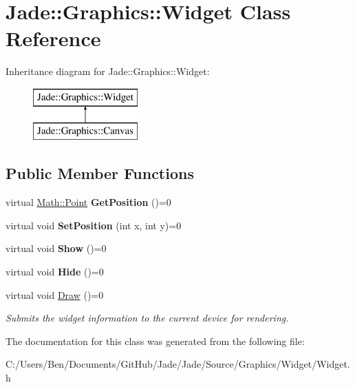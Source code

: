\hypertarget{class_jade_1_1_graphics_1_1_widget}{}\section{Jade\+:\+:Graphics\+:\+:Widget Class Reference}
\label{class_jade_1_1_graphics_1_1_widget}
Inheritance diagram for Jade\+:\+:Graphics\+:\+:Widget\+:\begin{figure}[H]
\begin{center}
\leavevmode
\includegraphics[height=2.000000cm]{class_jade_1_1_graphics_1_1_widget}
\end{center}
\end{figure}
\subsection*{Public Member Functions}
\begin{DoxyCompactItemize}
\item 
\hypertarget{class_jade_1_1_graphics_1_1_widget_a6b4cf0eb5064c61cf56ebb44681a2c60}{}virtual \hyperlink{class_jade_1_1_math_1_1_point}{Math\+::\+Point} {\bfseries Get\+Position} ()=0\label{class_jade_1_1_graphics_1_1_widget_a6b4cf0eb5064c61cf56ebb44681a2c60}

\item 
\hypertarget{class_jade_1_1_graphics_1_1_widget_ab89794b5d4ee480828ea6de52c9b1048}{}virtual void {\bfseries Set\+Position} (int x, int y)=0\label{class_jade_1_1_graphics_1_1_widget_ab89794b5d4ee480828ea6de52c9b1048}

\item 
\hypertarget{class_jade_1_1_graphics_1_1_widget_a16d7008052de562ea8d52b3c97c801c3}{}virtual void {\bfseries Show} ()=0\label{class_jade_1_1_graphics_1_1_widget_a16d7008052de562ea8d52b3c97c801c3}

\item 
\hypertarget{class_jade_1_1_graphics_1_1_widget_a0ad3acf723f554f315da105d9b36e921}{}virtual void {\bfseries Hide} ()=0\label{class_jade_1_1_graphics_1_1_widget_a0ad3acf723f554f315da105d9b36e921}

\item 
\hypertarget{class_jade_1_1_graphics_1_1_widget_adb8d9882202a73428260cbd3d8b15f9a}{}virtual void \hyperlink{class_jade_1_1_graphics_1_1_widget_adb8d9882202a73428260cbd3d8b15f9a}{Draw} ()=0\label{class_jade_1_1_graphics_1_1_widget_adb8d9882202a73428260cbd3d8b15f9a}

\begin{DoxyCompactList}\small\item\em Submits the widget information to the current device for rendering. \end{DoxyCompactList}\end{DoxyCompactItemize}


The documentation for this class was generated from the following file\+:\begin{DoxyCompactItemize}
\item 
C\+:/\+Users/\+Ben/\+Documents/\+Git\+Hub/\+Jade/\+Jade/\+Source/\+Graphics/\+Widget/Widget.\+h\end{DoxyCompactItemize}
